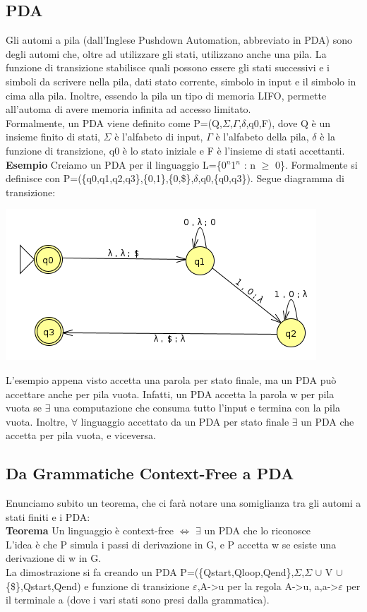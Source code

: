 \documentclass[]{article}
\begin{document}
		\subsection{PDA}
			Gli automi a pila (dall'Inglese Pushdown Automation, abbreviato in PDA) sono degli automi che, oltre ad utilizzare gli stati, utilizzano anche una pila. La funzione di transizione stabilisce quali possono essere gli stati successivi e i simboli da scrivere nella pila, dati stato corrente, simbolo in input e il simbolo in cima alla pila. Inoltre, essendo la pila un tipo di memoria LIFO, permette all'automa di avere memoria infinita ad accesso limitato.\\
			Formalmente, un PDA viene definito come P=(Q,$\Sigma$,$\Gamma$,$\delta$,q0,F), dove Q è un insieme finito di stati, $\Sigma$ è l'alfabeto di input, $\Gamma$ è l'alfabeto della pila, $\delta$ è la funzione di transizione, q0 è lo stato iniziale e F è l'insieme di stati accettanti.\\
			\textbf{Esempio} Creiamo un PDA per il linguaggio L=\{0$^n$1$^n$ : n $\geq$ 0\}. Formalmente si definisce con P=(\{q0,q1,q2,q3\},\{0,1\},\{0,\$\},$\delta$,q0,\{q0,q3\}). Segue diagramma di transizione:
			\begin{center}
				\includegraphics{PDA1.png}
			\end{center}
			L'esempio appena visto accetta una parola per stato finale, ma un PDA può accettare anche per pila vuota. Infatti, un PDA accetta la parola w per pila vuota se $\exists$ una computazione che consuma tutto l'input e termina con la pila vuota. Inoltre, $\forall$ linguaggio accettato da un PDA per stato finale $\exists$ un PDA che accetta per pila vuota, e viceversa.
		\subsection{Da Grammatiche Context-Free a PDA}
			Enunciamo subito un teorema, che ci farà notare una somiglianza tra gli automi a stati finiti e i PDA:\\
			\textbf{Teorema} Un linguaggio è context-free $\Leftrightarrow$ $\exists$ un PDA che lo riconosce\\
			L'idea è che P simula i passi di derivazione in G, e P accetta w se esiste una derivazione di w in G.\\
			La dimostrazione si fa creando un PDA P=(\{Qstart,Qloop,Qend\},$\Sigma$,$\Sigma$ $\cup$ V $\cup$ \{\$\},Qstart,{Qend}) e funzione di transizione $\varepsilon$,A-\textgreater u per la regola A-\textgreater u, a,a-\textgreater $\varepsilon$ per il terminale a (dove i vari stati sono presi dalla grammatica).
\end{document}
